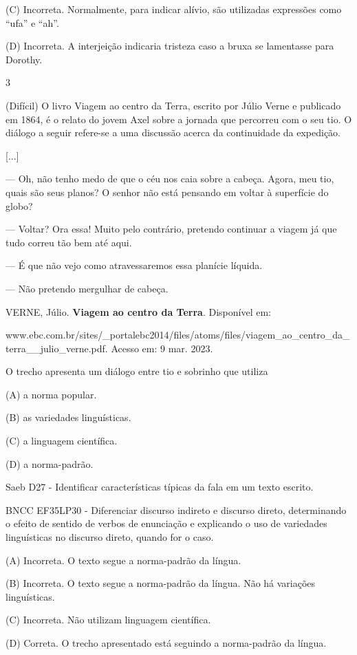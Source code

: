 \begin{itemize}
{{{\begin{itemize}
\begin{itemize}
\begin{itemize}
(C) Incorreta. Normalmente, para indicar alívio, são utilizadas
expressões como ``ufa'' e ``ah''.

(D) Incorreta. A interjeição indicaria tristeza caso a bruxa se
lamentasse para Dorothy.

\num{3}

(Difícil) O livro Viagem ao centro da Terra, escrito por Júlio Verne e
publicado em 1864, é o relato do jovem Axel sobre a jornada que
percorreu com o seu tio. O diálogo a seguir refere-se a uma discussão
acerca da continuidade da expedição.

{[}...{]}

--- Oh, não tenho medo de que o céu nos caia sobre a cabeça. Agora, meu
tio, quais são seus planos? O senhor não está pensando em voltar à
superfície do globo?

--- Voltar? Ora essa! Muito pelo contrário, pretendo continuar a viagem
já que tudo correu tão bem até aqui.

--- É que não vejo como atravessaremos essa planície líquida.

--- Não pretendo mergulhar de cabeça.

VERNE, Júlio. \textbf{Viagem ao centro da Terra}. Disponível em:

www.ebc.com.br/sites/\_portalebc2014/files/atoms/files/viagem\_ao\_centro\_da\_terra\_\_julio\_verne.pdf.
Acesso em: 9 mar. 2023.

O trecho apresenta um diálogo entre tio e sobrinho que utiliza

(A) a norma popular.

(B) as variedades linguísticas.

(C) a linguagem científica.

(D) a norma-padrão.

Saeb D27 - Identificar características típicas da fala em um texto
escrito.

BNCC EF35LP30 - Diferenciar discurso indireto e discurso direto,
determinando o efeito de sentido de verbos de enunciação e explicando o
uso de variedades linguísticas no discurso direto, quando for o caso.

(A) Incorreta. \protect\hypertarget{_Hlk129264642}{}{}O texto segue a
norma-padrão da língua.

(B) Incorreta. O texto segue a norma-padrão da língua. Não há variações
linguísticas.

(C) Incorreta. Não utilizam linguagem científica.

(D) Correta. O trecho apresentado está seguindo a norma-padrão da
língua.


\end{itemize}
\end{itemize}
\end{itemize}}}}
\end{itemize}
